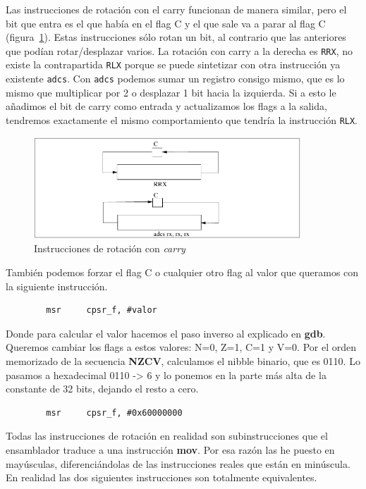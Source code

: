 Las instrucciones de rotación con el carry funcionan de manera
similar, pero el bit que entra es el que había en el flag C y el que sale va a
parar al flag C (figura~\ref{fig:instrRotCarry}). Estas instrucciones
sólo rotan un bit, al contrario que las anteriores que podían rotar/desplazar
varios. La rotación con carry a la derecha es {\tt RRX}, no existe la contrapartida
{\tt RLX} porque se puede sintetizar con otra instrucción ya existente {\tt adcs}.
Con {\tt adcs} podemos sumar un registro consigo mismo, que es lo mismo que multiplicar por 2
o desplazar 1 bit hacia la izquierda. Si a esto le añadimos el bit de carry como entrada
y actualizamos los flags a la salida, tendremos exactamente el mismo comportamiento
que tendría la instrucción {\tt RLX}.

\begin{figure}[h]
  \centering
    \includegraphics[width=10cm]{graphs/rrxadcs.pdf}
  \caption{Instrucciones de rotación con {\it carry}}
  \label{fig:instrRotCarry}
\end{figure}

También podemos forzar el flag C o cualquier otro flag al
valor que queramos con la siguiente instrucción.

\begin{lstlisting}
        msr     cpsr_f, #valor
\end{lstlisting}

Donde para calcular el valor hacemos el paso inverso al explicado en {\bf gdb}.
Queremos cambiar los flags a estos valores: N=0, Z=1, C=1 y V=0. Por el orden
memorizado de la secuencia {\bf NZCV}, calculamos el nibble binario, que es 0110.
Lo pasamos a hexadecimal 0110 -> 6 y lo ponemos en la parte más alta de la
constante de 32 bits, dejando el resto a cero.

\begin{lstlisting}
        msr     cpsr_f, #0x60000000
\end{lstlisting}

Todas las instrucciones de rotación en realidad son subinstrucciones que el
ensamblador traduce a una instrucción {\bf mov}. Por esa razón las he puesto
en mayúsculas, diferenciándolas de las instrucciones reales que están en
minúscula. En realidad las dos siguientes instrucciones son totalmente
equivalentes.

